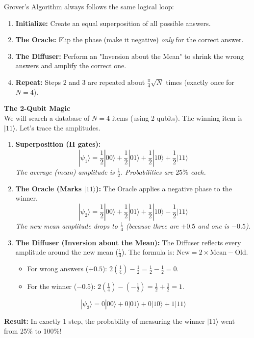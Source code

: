 \documentclass[a4paper,11pt]{article}
\begin{document}
Grover's Algorithm always follows the same logical loop:
\begin{enumerate}
    \item \textbf{Initialize:} Create an equal superposition of all possible answers.
    \item \textbf{The Oracle:} Flip the phase (make it negative) \textit{only} for the correct answer.
    \item \textbf{The Diffuser:} Perform an "Inversion about the Mean" to shrink the wrong answers and amplify the correct one.
    \item \textbf{Repeat:} Steps 2 and 3 are repeated about $\frac{\pi}{4}\sqrt{N}$ times (exactly once for $N=4$).
\end{enumerate}

\begin{mathbox}
\textbf{The 2-Qubit Magic}\\
We will search a database of $N=4$ items (using 2 qubits). The winning item is $|11\rangle$. Let's trace the amplitudes.
\begin{enumerate}
    \item \textbf{Superposition (H gates):}
    $$|\psi_1\rangle = \frac{1}{2}|00\rangle + \frac{1}{2}|01\rangle + \frac{1}{2}|10\rangle + \frac{1}{2}|11\rangle$$
    \textit{The average (mean) amplitude is $\frac{1}{2}$. Probabilities are $25\%$ each.}
    
    \item \textbf{The Oracle (Marks $|11\rangle$):} 
    The Oracle applies a negative phase to the winner.
    $$|\psi_2\rangle = \frac{1}{2}|00\rangle + \frac{1}{2}|01\rangle + \frac{1}{2}|10\rangle - \frac{1}{2}|11\rangle$$
    \textit{The new mean amplitude drops to $\frac{1}{4}$ (because three are $+0.5$ and one is $-0.5$).}
    
    \item \textbf{The Diffuser (Inversion about the Mean):}
    The Diffuser reflects every amplitude around the new mean ($\frac{1}{4}$). The formula is: $\text{New} = 2 \times \text{Mean} - \text{Old}$.
    \begin{itemize}
        \item For wrong answers ($+0.5$): $2(\frac{1}{4}) - \frac{1}{2} = \frac{1}{2} - \frac{1}{2} = 0$.
        \item For the winner ($-0.5$): $2(\frac{1}{4}) - (-\frac{1}{2}) = \frac{1}{2} + \frac{1}{2} = 1$.
    \end{itemize}
    $$|\psi_3\rangle = 0|00\rangle + 0|01\rangle + 0|10\rangle + 1|11\rangle$$
\end{enumerate}
\textbf{Result:} In exactly 1 step, the probability of measuring the winner $|11\rangle$ went from 25\% to 100\%!
\end{mathbox}
\end{document}
